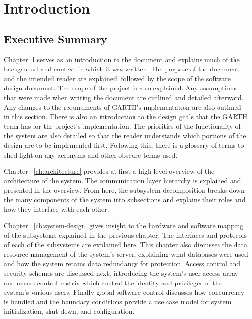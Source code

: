 \documentclass{report}
\begin{document}

\tableofcontents
\listoffigures
\listoftables
\chapter{Introduction} %
\label{ch:introduction}

\section{Executive Summary}

Chapter~\ref{ch:introduction} serves as an introduction to the document and
explains much of the background and context in which it was written. The
purpose of the document and the intended reader are explained, followed by the
scope of the software design document. The scope of the project is also
explained. Any assumptions that were made when writing the document are
outlined and detailed afterward. Any changes to the requirements of GARTH's
implementation are also outlined in this section. There is also an introduction
to the design goals that the GARTH team has for the project's implementation.
The priorities of the functionality of the system are also detailed so that the
reader understands which portions of the design are to be implemented first.
Following this, there is a glossary of terms to shed light on any acronyms and
other obscure terms used.

Chapter ~\ref{ch:architecture} provides at first a high level overview of the
architecture of the system. The communication layer hierarchy is explained and
presented in the overview. From here, the subsystem decomposition breaks down
the many components of the system into subsections and explains their roles and
how they interface with each other.

Chapter ~\ref{ch:system-design} gives insight to the hardware and software
mapping of the subsystems explained in the previous chapter. The interfaces and
protocols of each of the subsystems are explained here. This chapter also
discusses the data resource management of the system's server, explaining what
databases were used and how the system retains data redundancy for protection.
Access control and security schemes are discussed next, introducing the
system's user access array and access control matrix which control the identity
and privileges of the system's various users. Finally global software control
discusses how concurrency is handled and the boundary conditions provide a use
case model for system initialization, shut-down, and configuration.
\end{document}
